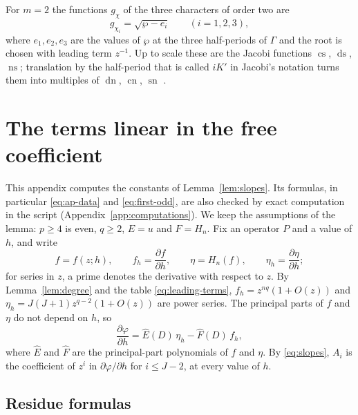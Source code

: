 \documentclass[11pt]{article}
\theoremstyle{definition}
\theoremstyle{remark}
\numberwithin{equation}{section}
\newcommand{\hatt}[1]{\widehat{#1}}
\DeclareMathOperator{\cs}{cs}
\DeclareMathOperator{\ds}{ds}
\DeclareMathOperator{\ns}{ns}
\DeclareMathOperator{\sn}{sn}
\DeclareMathOperator{\cn}{cn}
\DeclareMathOperator{\dn}{dn}
\begin{document}
For \(m=2\) the functions \(g_\chi\) of the three characters of order
two are
\begin{equation}\label{eq:jacobi}
 g_{\chi_i}=\sqrt{\wp-e_i}\qquad(i=1,2,3),
\end{equation}
where \(e_1,e_2,e_3\) are the values of \(\wp\) at the three
half-periods of \(\Gamma\) and the root is chosen with leading term
\(z^{-1}\). Up to scale these are the Jacobi functions \(\cs\), \(\ds\),
\(\ns\); translation by the half-period that is called \(iK'\) in
Jacobi's notation turns them into multiples of \(\dn\), \(\cn\), \(\sn\)
\citep[\S\S22.4, 23.6]{DLMFonline}.

\section{The terms linear in the free coefficient}\label{app:slopes}

This appendix computes the constants of Lemma~\ref{lem:slopes}. Its
formulas, in particular \eqref{eq:ap-data} and \eqref{eq:first-odd},
are also checked by exact computation in the script
\mbox{} (Appendix~\ref{app:computations}).
We keep the assumptions of the lemma: \(p\ge4\) is even, \(q\ge2\),
\(E=u\) and \(F=H_n\). Fix an operator \(P\) and a value of \(h\), and write
\[
 f=f(z;h),\qquad f_h=\frac{\partial f}{\partial h},\qquad
 \eta=H_n(f),\qquad \eta_h=\frac{\partial\eta}{\partial h};
\]
for series in \(z\), a prime denotes the derivative with respect to \(z\). By
Lemma~\ref{lem:degree} and the table \eqref{eq:leading-terms},
\(f_h=z^{nq}(1+O(z))\) and
\(\eta_h=J(J+1)z^{q-2}(1+O(z))\) are power series. The principal parts
of \(f\) and \(\eta\) do not depend on \(h\), so
\begin{equation}\label{eq:lin-phi}
 \frac{\partial\varphi}{\partial h}=\hatt E(D)\,\eta_h-\hatt F(D)\,f_h,
\end{equation}
where \(\hatt E\) and \(\hatt F\) are the principal-part polynomials of
\(f\) and \(\eta\). By \eqref{eq:slopes}, \(A_i\) is the coefficient of
\(z^i\) in \(\partial\varphi/\partial h\) for \(i\le J-2\), at every
value of \(h\).

\subsection{Residue formulas}
\end{document}
